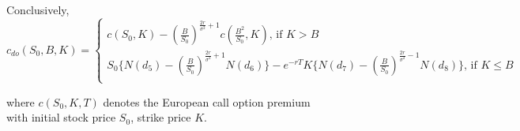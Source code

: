 Conclusively, 
\begin{equation*}
c_{do}(S_{0}, B, K) = 
\begin{cases}
c(S_{0}, K) - {(\frac{B}{S_{0}})}^{\frac{2r}{\sigma^{2}}+1} c(\frac{B^{2}}{S_{0}}, K) \text{, if }K > B\\
S_{0}\{ N(d_{5}) - {(\frac{B}{S_{0}})}^{\frac{2r}{\sigma^{2}}+1} N(d_{6})\} - e^{-rT}K\{ N(d_{7}) - {(\frac{B}{S_{0}})}^{\frac{2r}{\sigma^{2}}-1} N(d_{8})\} \text{, if }K \le B\\
\end{cases}
\end{equation*}
\begin{center}
where $c(S_{0}, K, T)$ denotes the European call option premium\\ with initial stock price $S_{0}$, strike price $K$.
\end{center}
\newpage

